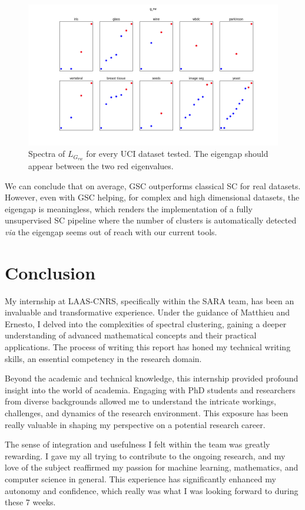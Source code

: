 \documentclass[a4paper,12pt]{article}
\theoremstyle{definition}
\theoremstyle{plain}
\begin{document}
\begin{figure}[H]
	\centering
	\includegraphics[width=0.9\linewidth]{figures/UCI_g_rw}
	\caption{Spectra of $L_{G_{rw}}$ for every UCI dataset tested. The eigengap should appear between the two red eigenvalues.}
	\label{fig:UCI_g_rw}
\end{figure}
We can conclude that on average, GSC outperforms classical SC for real datasets. However, even with GSC helping, for complex and high dimensional datasets, the eigengap is meaningless, which renders the implementation of a fully unsupervised SC pipeline where the number of clusters is automatically detected \textit{via} the eigengap seems out of reach with our current tools.
\newpage
\section{Conclusion}

My internship at LAAS-CNRS, specifically within the SARA team, has been an invaluable and transformative experience. Under the guidance of Matthieu and Ernesto, I delved into the complexities of spectral clustering, gaining a deeper understanding of advanced mathematical concepts and their practical applications. The process of writing this report has honed my technical writing skills, an essential competency in the research domain.

Beyond the academic and technical knowledge, this internship provided profound insight into the world of academia. Engaging with PhD students and researchers from diverse backgrounds allowed me to understand the intricate workings, challenges, and dynamics of the research environment. This exposure has been really valuable in shaping my perspective on a potential research career.

The sense of integration and usefulness I felt within the team was greatly rewarding. I gave my all trying to contribute to the ongoing research, and my love of the subject reaffirmed my passion for machine learning, mathematics, and computer science in general. This experience has significantly enhanced my autonomy and confidence, which really was what I was looking forward to during these 7 weeks.
\end{document}
